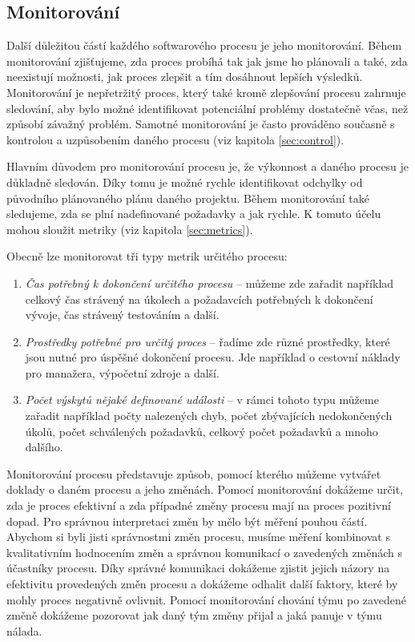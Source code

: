 \documentclass[czech,master,public,dept460,male,cpdeclaration,oneside]{diploma}
\begin{document}
\subsection{Monitorování}
Další důležitou částí každého softwarového procesu je jeho monitorování. Během monitorování zjišťujeme, zda proces probíhá tak jak jsme ho plánovali a také, zda neexistují možnosti, jak proces zlepšit a tím dosáhnout lepších výsledků. Monitorování je nepřetržitý proces, který také kromě zlepšování procesu zahrnuje sledování, aby bylo možné identifikovat potenciální problémy dostatečně včas, než způsobí závažný problém. Samotné monitorování je často prováděno současně s kontrolou a uzpůsobením daného procesu (viz kapitola \ref{sec:control}).

Hlavním důvodem pro monitorování procesu je, že výkonnost a daného procesu je důkladně sledován. Díky tomu je možné rychle identifikovat odchylky od původního plánovaného plánu daného projektu. Během monitorování také sledujeme, zda se plní nadefinované požadavky a jak rychle. K tomuto účelu mohou sloužit metriky (viz kapitola \ref{sec:metrics}).

Obecně lze monitorovat tři typy metrik určitého procesu:

\begin{enumerate}
\item \textit{Čas potřebný k dokončení určitého procesu} -- můžeme zde zařadit například celkový čas strávený na úkolech a požadavcích potřebných k dokončení vývoje, čas strávený testováním a další.

\item \textit{Prostředky potřebné pro určitý proces} -- řadíme zde různé prostředky, které jsou nutné pro úspěšné dokončení procesu. Jde například o cestovní náklady pro manažera, výpočetní zdroje a další.

\item \textit{Počet výskytů nějaké definované události} -- v rámci tohoto typu můžeme zařadit například počty nalezených chyb, počet zbývajících nedokončených úkolů, počet schválených požadavků, celkový počet požadavků a mnoho dalšího.
\end{enumerate}

Monitorování procesu představuje způsob, pomocí kterého můžeme vytvářet doklady o daném procesu a jeho změnách. Pomocí monitorování dokážeme určit, zda je proces efektivní a zda případné změny procesu mají na proces pozitivní dopad. Pro správnou interpretaci změn by mělo být měření pouhou částí. Abychom si byli jisti správnostmi změn procesu, musíme měření kombinovat s kvalitativním hodnocením změn a správnou komunikací o zavedených změnách s účastníky procesu. Díky správné komunikaci dokážeme zjistit jejich názory na efektivitu provedených změn procesu a dokážeme odhalit další faktory, které by mohly proces negativně ovlivnit. Pomocí monitorování chování týmu po zavedené změně dokážeme pozorovat jak daný tým změny přijal a jaká panuje v týmu nálada.
\end{document}
